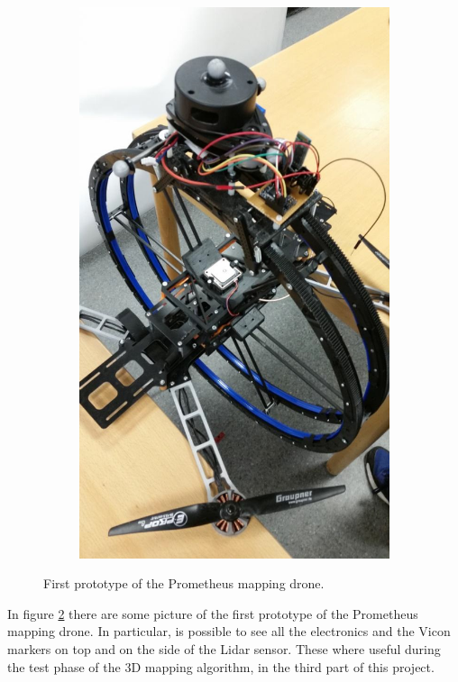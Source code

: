 \begin{figure}[h]
\begin{subfigure}[t]{0.49\textwidth}
		\includegraphics[scale = 0.25]{images/prometheus3.jpg}
		\label{subfig:prometheus4}
	\end{subfigure}
	\caption{First prototype of the Prometheus mapping drone.}
	\label{fig:prometheus}
\end{figure}

\noindent In figure \ref{fig:prometheus} there are some picture of the first prototype of the Prometheus mapping drone. In particular, is possible to see all the electronics and the Vicon markers on top and on the side of the Lidar sensor. These where useful during the test phase of the 3D mapping algorithm, in the third part of this project. 

